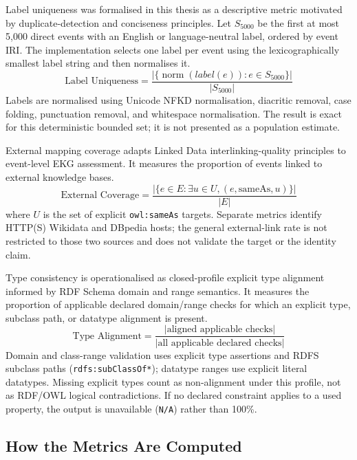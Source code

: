 Label uniqueness was formalised in this thesis as a descriptive metric motivated by duplicate-detection and conciseness principles. Let $S_{5000}$ be the first at most 5,000 direct events with an English or language-neutral label, ordered by event IRI. The implementation selects one label per event using the lexicographically smallest label string and then normalises it.
\begin{equation}
\text{Label Uniqueness} =
\frac{|\{\operatorname{norm}(label(e)) : e \in S_{5000}\}|}{|S_{5000}|}
\end{equation}
Labels are normalised using Unicode NFKD normalisation, diacritic removal, case folding, punctuation removal, and whitespace normalisation. The result is exact for this deterministic bounded set; it is not presented as a population estimate.

External mapping coverage adapts Linked Data interlinking-quality principles to event-level EKG assessment. It measures the proportion of events linked to external knowledge bases.
\begin{equation}
\text{External Coverage} = \frac{|\{e \in E : \exists u \in U, (e, \text{sameAs}, u)\}|}{|E|}
\end{equation}
where $U$ is the set of explicit \texttt{owl:sameAs} targets. Separate metrics identify HTTP(S) Wikidata and DBpedia hosts; the general external-link rate is not restricted to those two sources and does not validate the target or the identity claim.

Type consistency is operationalised as closed-profile explicit type alignment informed by RDF Schema domain and range semantics. It measures the proportion of applicable declared domain/range checks for which an explicit type, subclass path, or datatype alignment is present.
\begin{equation}
\text{Type Alignment} = \frac{|\text{aligned applicable checks}|}{|\text{all applicable declared checks}|}
\end{equation}
Domain and class-range validation uses explicit type assertions and RDFS subclass paths (\texttt{rdfs:subClassOf*}); datatype ranges use explicit literal datatypes. Missing explicit types count as non-alignment under this profile, not as RDF/OWL logical contradictions. If no declared constraint applies to a used property, the output is unavailable (\texttt{N/A}) rather than 100\%.

\subsection{How the Metrics Are Computed}

